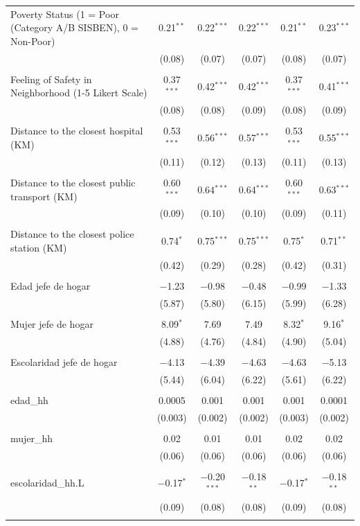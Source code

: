 \begin{table}[H]
\begin{tabularx}{0.9\textwidth}{@{\extracolsep{-7pt}}lccccc}
 Poverty Status (1 = Poor (Category A/B SISBEN), 0 = Non-Poor) & 0.21$^{**}$ & 0.22$^{***}$ & 0.22$^{***}$ & 0.21$^{**}$ & 0.23$^{***}$ \\    & (0.08) & (0.07) & (0.07) & (0.08) & (0.07) \\    & & & & & \\   Feeling of Safety in Neighborhood (1-5 Likert Scale) & 0.37$^{***}$ & 0.42$^{***}$ & 0.42$^{***}$ & 0.37$^{***}$ & 0.41$^{***}$ \\    & (0.08) & (0.08) & (0.09) & (0.08) & (0.09) \\    & & & & & \\   Distance to the closest hospital (KM) & 0.53$^{***}$ & 0.56$^{***}$ & 0.57$^{***}$ & 0.53$^{***}$ & 0.55$^{***}$ \\    & (0.11) & (0.12) & (0.13) & (0.11) & (0.13) \\    & & & & & \\   Distance to the closest public transport  (KM) & 0.60$^{***}$ & 0.64$^{***}$ & 0.64$^{***}$ & 0.60$^{***}$ & 0.63$^{***}$ \\    & (0.09) & (0.10) & (0.10) & (0.09) & (0.11) \\    & & & & & \\   Distance to the closest police station (KM) & 0.74$^{*}$ & 0.75$^{***}$ & 0.75$^{***}$ & 0.75$^{*}$ & 0.71$^{**}$ \\    & (0.42) & (0.29) & (0.28) & (0.42) & (0.31) \\    & & & & & \\   Edad jefe de hogar & $-$1.23 & $-$0.98 & $-$0.48 & $-$0.99 & $-$1.33 \\    & (5.87) & (5.80) & (6.15) & (5.99) & (6.28) \\    & & & & & \\   Mujer jefe de hogar & 8.09$^{*}$ & 7.69 & 7.49 & 8.32$^{*}$ & 9.16$^{*}$ \\    & (4.88) & (4.76) & (4.84) & (4.90) & (5.04) \\    & & & & & \\   Escolaridad jefe de hogar & $-$4.13 & $-$4.39 & $-$4.63 & $-$4.63 & $-$5.13 \\    & (5.44) & (6.04) & (6.22) & (5.61) & (6.22) \\    & & & & & \\   edad\_hh & 0.0005 & 0.001 & 0.001 & 0.001 & 0.0001 \\    & (0.003) & (0.002) & (0.002) & (0.003) & (0.002) \\    & & & & & \\   mujer\_hh & 0.02 & 0.01 & 0.01 & 0.02 & 0.02 \\    & (0.06) & (0.06) & (0.06) & (0.06) & (0.06) \\    & & & & & \\   escolaridad\_hh.L & $-$0.17$^{*}$ & $-$0.20$^{***}$ & $-$0.18$^{**}$ & $-$0.17$^{*}$ & $-$0.18$^{**}$ \\    & (0.09) & (0.08) & (0.08) & (0.09) & (0.08) \\    & & & & & \\   
\end{tabularx}
\end{table}
